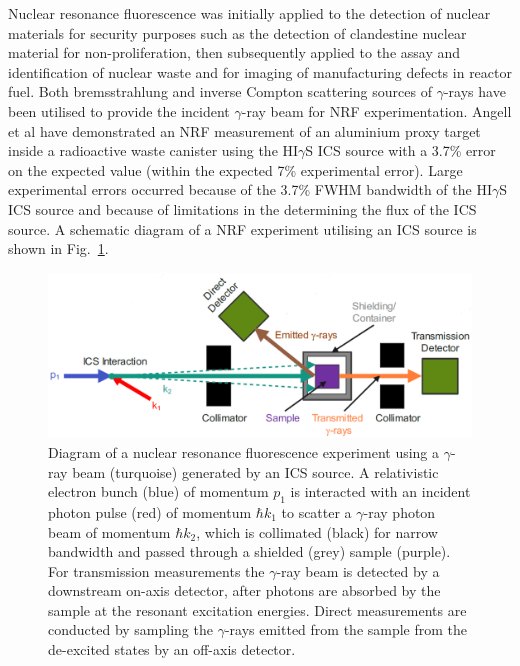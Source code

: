 \documentclass[../main.tex]{subfiles}
\begin{document}
Nuclear resonance fluorescence was initially applied to the detection of nuclear materials for security purposes such as the detection of clandestine nuclear material \cite{bertozzi2005nuclear,pruet2006detecting,geddes2017impact} for non-proliferation, then subsequently applied to the assay and identification of nuclear waste \cite{hayakawa2010nondestructive,angell2015demonstration,bolind2015states} and for imaging of manufacturing defects in reactor fuel. Both bremsstrahlung \cite{bertozzi2005nuclear} and inverse Compton scattering sources \cite{angell2015demonstration} of $\gamma$-rays have been utilised to provide the incident $\gamma$-ray beam for NRF experimentation. Angell et al \cite{angell2015demonstration} have demonstrated an NRF measurement of an aluminium proxy target inside a radioactive waste canister using the HI$\gamma$S ICS source with a 3.7\% error on the expected value (within the expected 7\% experimental error). Large experimental errors occurred because of the 3.7\% FWHM bandwidth of the HI$\gamma$S ICS source and because of limitations in the determining the flux of the ICS source. A schematic diagram of a NRF experiment utilising an ICS source is shown in Fig.~\ref{fig:NRF_diagram}.
\begin{figure}[!h]
\centering
\includegraphics[width=\textwidth]{Figures/DIANA_Inverse_Compton_Source_Design/NRF_diagram_fixed.pdf}
\caption{Diagram of a nuclear resonance fluorescence experiment using a $\gamma$-ray beam (turquoise) generated by an ICS source. A relativistic electron bunch (blue) of momentum $p_{1}$ is interacted with an incident photon pulse (red) of momentum $\hbar k_{1}$ to scatter a $\gamma$-ray photon beam of momentum $\hbar k_{2}$, which is collimated (black) for narrow bandwidth and passed through a shielded (grey) sample (purple).  For transmission measurements the $\gamma$-ray beam is detected by a downstream on-axis detector, after photons are absorbed by the sample at the resonant excitation energies. Direct measurements are conducted by sampling the $\gamma$-rays emitted from the sample from the de-excited states by an off-axis detector.}
\label{fig:NRF_diagram}
\end{figure}
\end{document}
